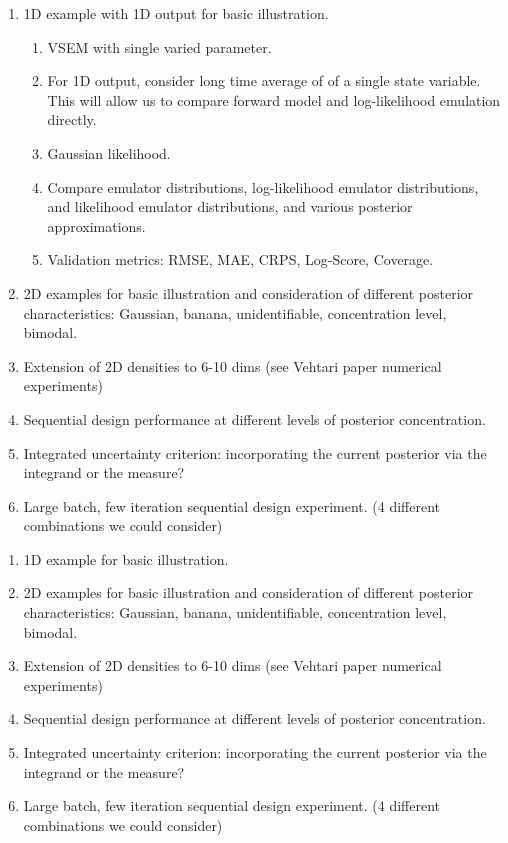 \documentclass[12pt]{article}
\begin{document}
\begin{enumerate}
\item 1D example with 1D output for basic illustration. 
	\begin{enumerate}
	\item VSEM with single varied parameter. 
	\item For 1D output, consider long time average of of a single state variable. This will allow us to compare forward model and log-likelihood emulation directly.
	\item Gaussian likelihood. 
	\item Compare emulator distributions, log-likelihood emulator distributions, and likelihood emulator distributions, and various posterior approximations. 
	\item Validation metrics: RMSE, MAE, CRPS, Log-Score, Coverage. 
	\end{enumerate}
\item 2D examples for basic illustration and consideration of different posterior characteristics: Gaussian, banana, unidentifiable, concentration level, bimodal. 
\item Extension of 2D densities to 6-10 dims (see Vehtari paper numerical experiments) 
\item Sequential design performance at different levels of posterior concentration. 
\item Integrated uncertainty criterion: incorporating the current posterior via the integrand or the measure?
\item Large batch, few iteration sequential design experiment. 
(4 different combinations we could consider) 
\end{enumerate}

\begin{enumerate}
\item 1D example for basic illustration. 
\item 2D examples for basic illustration and consideration of different posterior characteristics: Gaussian, banana, unidentifiable, concentration level, bimodal. 
\item Extension of 2D densities to 6-10 dims (see Vehtari paper numerical experiments) 
\item Sequential design performance at different levels of posterior concentration. 
\item Integrated uncertainty criterion: incorporating the current posterior via the integrand or the measure?
\item Large batch, few iteration sequential design experiment. 
(4 different combinations we could consider) 
\end{enumerate}
\end{document}
